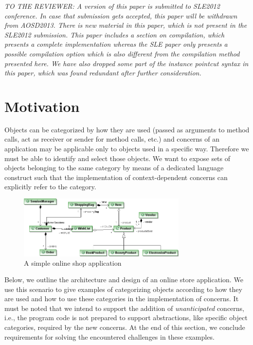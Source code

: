 \emph{TO THE REVIEWER: A version of this paper is submitted to SLE2012 conference. In case that submission gets accepted, this paper will be withdrawn from AOSD2013. There is new material in this paper, which is not present in the SLE2012 submission. This paper includes a section on compilation, which presents a complete implementation whereas the SLE paper only presents a possible compilation option which is also different from the compilation method presented here. We have also dropped some part of the instance pointcut syntax in this paper, which was found redundant after further consideration.}

\section{Motivation}
\label{sect:motivation}

Objects can be categorized by how they are used (passed as arguments to method calls, act as receiver or sender for method calls, etc.) and concerns of an application may be applicable only to objects used in a specific way.
Therefore we must be able to identify and select those objects.
We want to expose sets of objects belonging to the same category by means of a dedicated language construct such that the implementation of context-dependent concerns can explicitly refer to the category.

\begin{figure}
\centering
\includegraphics[width= 0.75\textwidth]{images/myonlineshop.png}%
\vspace{10pt}
\caption{A simple online shop application}%
\label{fig:shop}%
\end{figure}

Below, we outline the architecture and design of an online store application. We use this scenario to give examples of categorizing objects according to how they are used and how to use these categories in the implementation of concerns. It must be noted that we intend to support the addition of \emph{unanticipated} concerns, i.e., the program code is not prepared to support abstractions, like specific object categories, required by the new concerns.
At the end of this section, we conclude requirements for solving the encountered challenges in these examples.

